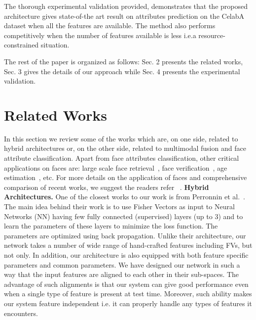\documentclass{sig-alternate-05-2015}
\begin{document}
The thorough experimental validation provided, demonstrates that the proposed architecture gives state-of-the art result on attributes prediction on the CelabA dataset when all the features are available. The method also performs competitively when the number of features available is less i.e.\in a resource-constrained situation.

The rest of the paper is organized	 as follows: Sec. 2 presents the related works, Sec. 3 gives the details of our approach while Sec. 4 presents the experimental validation.

\section{Related Works}\label{sec:related_works}
In this section we review some of the works which are, on one side,  related to hybrid architectures or, on the other side, related to multimodal fusion and face attribute classification. Apart from face attributes classification, other critical applications on faces are: large scale face retrieval~\cite{bhattarai2014some,bhattarai2016cvpr}, face verification~\cite{lhs_cviu_2016,simonyan2013fisher,parkhi2015deep,taigman2014deepface},   age estimation~\cite{bhattarai2016joint,guo2014study}, etc. For more details on the application of faces and comprehensive comparison of recent works, we suggest the readers refer  ~\cite{learned2016labeled}.
\textbf{Hybrid Architectures.}
One of the closest works to our work is from Perronnin et al.~\cite{perronnin2015fisher}. The main idea behind their work is 
to use Fisher Vectors as input to  Neural Networks (NN) having few fully connected (supervised) layers (up to 3) and to learn the parameters of these layers to minimize the loss function. The parameters are optimized using back propagation.  
Unlike their architecture, our network takes a number of wide range of hand-crafted features including FVs, but not only. In addition, our architecture is also equipped with both feature specific parameters and common parameters. We have designed our network in such a way that the input 
features are aligned to each other in their sub-spaces. The advantage of such alignments is that our system can give good performance even when 
a single type of feature is present at test time. Moreover, such ability makes our system feature independent i.e. it can properly handle 
any types of features it encounters.
\end{document}
